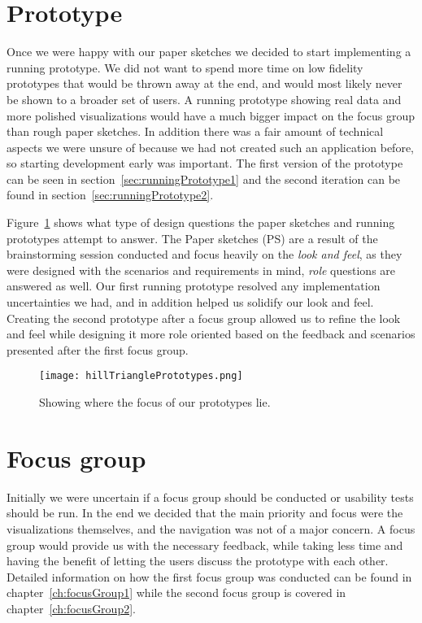 \section{Prototype}
Once we were happy with our paper sketches we decided to start implementing a running prototype. We did not want to spend more time on low fidelity prototypes that would be thrown away at the end, and would most likely never be shown to a broader set of users. A running prototype showing real data and more polished visualizations would have a much bigger impact on the focus group than rough paper sketches. In addition there was a fair amount of technical aspects we were unsure of because we had not created such an application before, so starting development early was important. The first version of the prototype can be seen in section~\ref{sec:runningPrototype1} and the second iteration can be found in section~\ref{sec:runningPrototype2}.

Figure~\ref{fig:hillTrianglePrototypex} shows what type of design questions the paper sketches and running prototypes attempt to answer. The Paper sketches (PS) are a result of the brainstorming session conducted and focus heavily on the \textit{look and feel}, as they were designed with the scenarios and requirements in mind, \textit{role} questions are answered as well. Our first running prototype resolved any implementation uncertainties we had, and in addition helped us solidify our look and feel. Creating the second prototype after a focus group allowed us to refine the look and feel while designing it more role oriented based on the feedback and scenarios presented after the first focus group.

\begin{figure}[h!]
	\centering
		\texttt{[image: hillTrianglePrototypes.png]}
		\caption{\footnotesize Showing where the focus of our prototypes lie.}
		\label{fig:hillTrianglePrototypex}
\end{figure}

\section{Focus group}
Initially we were uncertain if a focus group should be conducted or usability tests should be run. In the end we decided that the main priority and focus were the visualizations themselves, and the navigation was not of a major concern. A focus group would provide us with the necessary feedback, while taking less time and having the benefit of letting the users discuss the prototype with each other. Detailed information on how the first focus group was conducted can be found in chapter~\ref{ch:focusGroup1} while the second focus group is covered in chapter~\ref{ch:focusGroup2}.

